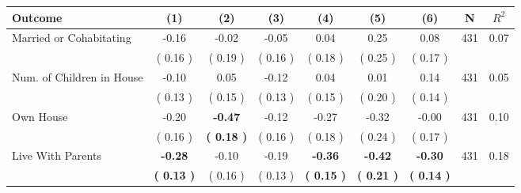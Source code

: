 \begin{tabular}{lcccccccc}
\toprule
 \textbf{Outcome} & \textbf{(1)} & \textbf{(2)} & \textbf{(3)} & \textbf{(4)} & \textbf{(5)} & \textbf{(6)} & \textbf{N} & \textbf{$ R^2$} \\
\midrule
Married or Cohabitating &     -0.16 &     -0.02 &     -0.05 &      0.04 &      0.25 &      0.08 & 431 &       0.07 \\ 
 & (     0.16 ) & (     0.19 ) & (     0.16 ) & (     0.18 ) & (     0.25 ) & (     0.17 ) & \\
Num. of Children in House &     -0.10 &      0.05 &     -0.12 &      0.04 &      0.01 &      0.14 & 431 &       0.05 \\ 
 & (     0.13 ) & (     0.15 ) & (     0.13 ) & (     0.15 ) & (     0.20 ) & (     0.14 ) & \\
Own House &     -0.20 & \textbf{    -0.47} &     -0.12 &     -0.27 &     -0.32 &     -0.00 & 431 &       0.10 \\ 
 & (     0.16 ) & \textbf{(     0.18 )} & (     0.16 ) & (     0.18 ) & (     0.24 ) & (     0.17 ) & \\
Live With Parents & \textbf{    -0.28} &     -0.10 &     -0.19 & \textbf{    -0.36} & \textbf{    -0.42} & \textbf{    -0.30} & 431 &       0.18 \\ 
 & \textbf{(     0.13 )} & (     0.16 ) & (     0.13 ) & \textbf{(     0.15 )} & \textbf{(     0.21 )} & \textbf{(     0.14 )} & \\
\bottomrule
\end{tabular}
